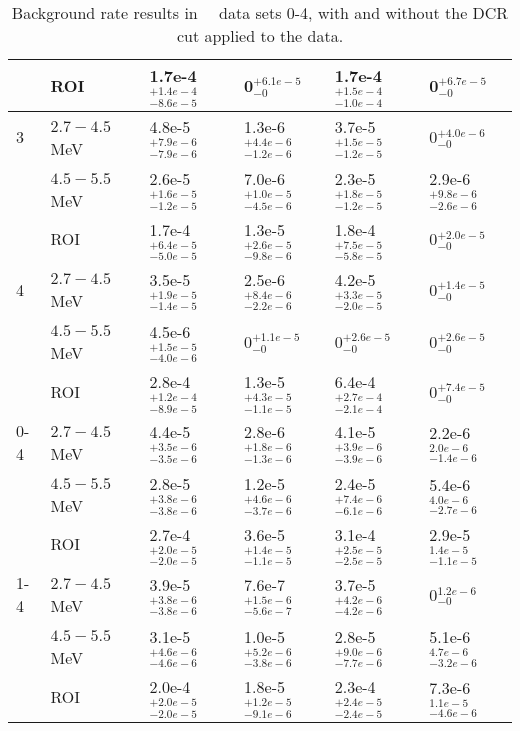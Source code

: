\begin{table}[]
\begin{tabular}{l p{1in} l l l l }
  &             ROI &         1.7e-4$^{+1.4e-4}_{-8.6e-5}$ &         0$^{+6.1e-5}_{-0}$ &         1.7e-4$^{+1.5e-4}_{-1.0e-4}$ &         0$^{+6.7e-5}_{-0}$  \\
\hline
3 &  $2.7-4.5$\,MeV &         4.8e-5$^{+7.9e-6}_{-7.9e-6}$ &         1.3e-6$^{+4.4e-6}_{-1.2e-6}$ &         3.7e-5$^{+1.5e-5}_{-1.2e-5}$ &         0$^{+4.0e-6}_{-0}$  \\
  &  $4.5-5.5$\,MeV &         2.6e-5$^{+1.6e-5}_{-1.2e-5}$ &         7.0e-6$^{+1.0e-5}_{-4.5e-6}$ &         2.3e-5$^{+1.8e-5}_{-1.2e-5}$ &         2.9e-6$^{+9.8e-6}_{-2.6e-6}$  \\
  &             ROI &         1.7e-4$^{+6.4e-5}_{-5.0e-5}$ &         1.3e-5$^{+2.6e-5}_{-9.8e-6}$ &         1.8e-4$^{+7.5e-5}_{-5.8e-5}$ &         0$^{+2.0e-5}_{-0}$  \\
\hline
4 &  $2.7-4.5$\,MeV &         3.5e-5$^{+1.9e-5}_{-1.4e-5}$ &         2.5e-6$^{+8.4e-6}_{-2.2e-6}$ &         4.2e-5$^{+3.3e-5}_{-2.0e-5}$ &         0$^{+1.4e-5}_{-0}$  \\
  &  $4.5-5.5$\,MeV &         4.5e-6$^{+1.5e-5}_{-4.0e-6}$ &         0$^{+1.1e-5}_{-0}$ &         0$^{+2.6e-5}_{-0}$ &         0$^{+2.6e-5}_{-0}$  \\
  &             ROI &         2.8e-4$^{+1.2e-4}_{-8.9e-5}$ &         1.3e-5$^{+4.3e-5}_{-1.1e-5}$ &         6.4e-4$^{+2.7e-4}_{-2.1e-4} $&         0$^{+7.4e-5}_{-0}$  \\
\hline
\hline
0-4 &  $2.7-4.5$\,MeV &         4.4e-5$^{+3.5e-6}_{-3.5e-6}$   &         2.8e-6$^{+1.8e-6}_{-1.3e-6}$  &          4.1e-5$^{+ 3.9e-6}_{-3.9e-6}$ &         2.2e-6$^{2.0e-6}_{-1.4e-6}$ \\
  &  $4.5-5.5$\,MeV &         2.8e-5$^{+3.8e-6}_{-3.8e-6}$   &         1.2e-5$^{+4.6e-6}_{-3.7e-6}$  &          2.4e-5$^{+ 7.4e-6}_{-6.1e-6}$ &         5.4e-6$^{4.0e-6}_{-2.7e-6}$ \\
  &             ROI &         2.7e-4$^{+2.0e-5}_{-2.0e-5}$   &         3.6e-5$^{+1.4e-5}_{-1.1e-5}$  &          3.1e-4$^{+ 2.5e-5}_{-2.5e-5}$ &         2.9e-5$^{1.4e-5}_{-1.1e-5}$ \\
\hline
1-4 &  $2.7-4.5$\,MeV &         3.9e-5$^{+3.8e-6}_{-3.8e-6}$   &         7.6e-7$^{+1.5e-6}_{-5.6e-7}$  &          3.7e-5$^{+ 4.2e-6}_{-4.2e-6}$ &         0$^{1.2e-6}_{-0}$ \\
 &  $4.5-5.5$\,MeV &         3.1e-5$^{+4.6e-6}_{-4.6e-6}$   &         1.0e-5$^{+5.2e-6}_{-3.8e-6}$  &          2.8e-5$^{+ 9.0e-6}_{-7.7e-6}$ &         5.1e-6$^{4.7e-6}_{-3.2e-6}$ \\
 &             ROI &         2.0e-4$^{+2.0e-5}_{-2.0e-5}$   &         1.8e-5$^{+1.2e-5}_{-9.1e-6}$  &          2.3e-4$^{+ 2.4e-5}_{-2.4e-5}$ &         7.3e-6$^{1.1e-5}_{-4.6e-6}$ \\                                                                                                                  
\end{tabular}
\caption[Background rate results in \MJ\ \DEM\ data sets 0-4] {Background rate results in \MJ\ \DEM\ data sets 0-4, with and without the DCR cut applied to the data.}
\label{tab:bkg_rates} 
\end{table}

